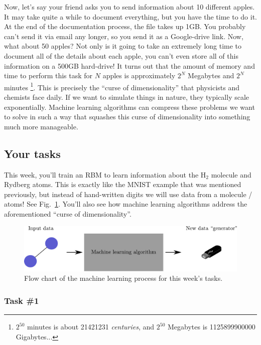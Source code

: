\documentclass[12pt]{article}
\begin{document}
Now, let's say your friend asks you to send information about 10 different apples. It may take quite a while to document everything, but you have the time to do it. At the end of the documentation process, the file takes up 1GB. You probably can't send it via email any longer, so you send it as a Google-drive link. Now, what about 50 apples? Not only is it going to take an extremely long time to document all of the details about each apple, you can't even store all of this information on a 500GB hard-drive! It turns out that the amount of memory and time to perform this task for $N$ apples is approximately $2^N$ Megabytes and $2^N$ minutes \footnote{$2^{50}$ minutes is about 21421231 \textit{centuries}, and $2^{50}$ Megabytes is 1125899900000 Gigabytes...}.
This is precisely the ``curse of dimensionality'' that physicists and chemists face daily. If we want to simulate things in nature, they typically scale exponentially. Machine learning algorithms can compress these problems we want to solve in such a way that squashes this curse of dimensionality into something much more manageable.

\subsection*{Your tasks} \label{sec:tasks}

This week, you'll train an RBM to learn information about the H$_2$ molecule and Rydberg atoms. This is exactly like the MNIST example that was mentioned previously, but instead of hand-written digits we will use data from a molecule / atoms! See Fig.~\ref{fig:H2_ML}. You'll also see how machine learning algorithms address the aforementioned ``curse of dimensionality''.

\begin{figure}
    \begin{center}
        \includegraphics[width=\linewidth]{../figures/H2_ML.pdf}
    \end{center}
    \caption{Flow chart of the machine learning process for this week's tasks.}
    \label{fig:H2_ML}
\end{figure}

\subsubsection*{Task \#1}
\end{document}
